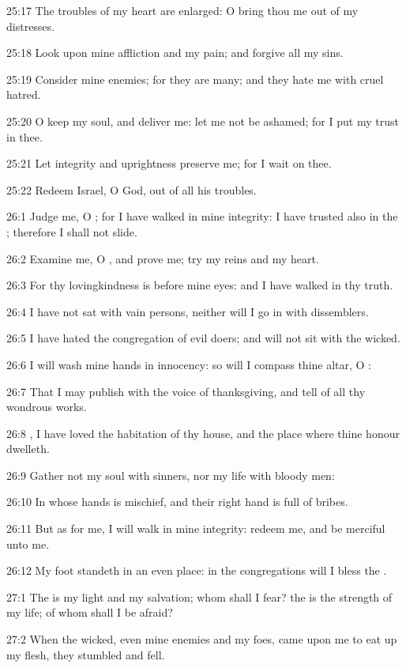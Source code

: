 25:17 The troubles of my heart are enlarged: O bring thou me out of my
distresses.

25:18 Look upon mine affliction and my pain; and forgive all my sins.

25:19 Consider mine enemies; for they are many; and they hate me with
cruel hatred.

25:20 O keep my soul, and deliver me: let me not be ashamed; for I put
my trust in thee.

25:21 Let integrity and uprightness preserve me; for I wait on thee.

25:22 Redeem Israel, O God, out of all his troubles.



26:1 Judge me, O \LORD; for I have walked in mine integrity: I have
trusted also in the \LORD; therefore I shall not slide.

26:2 Examine me, O \LORD, and prove me; try my reins and my heart.

26:3 For thy lovingkindness is before mine eyes: and I have walked in
thy truth.

26:4 I have not sat with vain persons, neither will I go in with
dissemblers.

26:5 I have hated the congregation of evil doers; and will not sit
with the wicked.

26:6 I will wash mine hands in innocency: so will I compass thine
altar, O \LORD:

26:7 That I may publish with the voice of thanksgiving, and tell of
all thy wondrous works.

26:8 \LORD, I have loved the habitation of thy house, and the place
where thine honour dwelleth.

26:9 Gather not my soul with sinners, nor my life with bloody men:

26:10 In whose hands is mischief, and their right hand is full of
bribes.

26:11 But as for me, I will walk in mine integrity: redeem me, and be
merciful unto me.

26:12 My foot standeth in an even place: in the congregations will I
bless the \LORD.



27:1 The \LORD is my light and my salvation; whom shall I fear? the
\LORD is the strength of my life; of whom shall I be afraid?

27:2 When the wicked, even mine enemies and my foes, came upon me to
eat up my flesh, they stumbled and fell.

